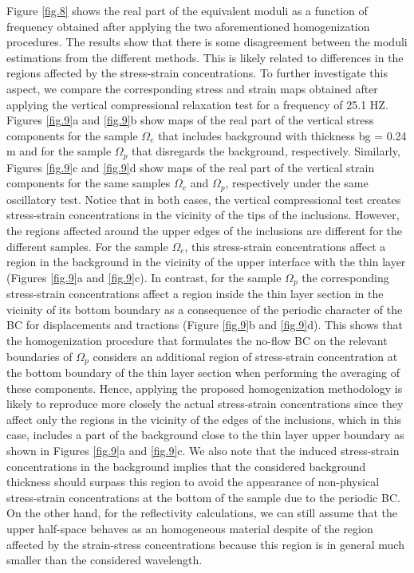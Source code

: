 \documentclass[draft]{agujournal2019}
\begin{document}
Figure \ref{fig.8} shows the real part of the  equivalent moduli as a function of frequency obtained after applying the two aforementioned homogenization procedures.
The results show that there is some disagreement between the moduli estimations from the different methods.
This is likely related to differences in the regions affected by the stress-strain concentrations. To further investigate this aspect, we compare the corresponding stress and strain maps obtained after applying the vertical compressional relaxation test for a frequency of 25.1 HZ. Figures \ref{fig.9}a and \ref{fig.9}b show maps of the real part of the vertical stress components for the sample $\Omega_e$ that includes background with thickness bg = 0.24 m and for the sample $\Omega_p$ that disregards the background, respectively. Similarly, Figures \ref{fig.9}c and \ref{fig.9}d show maps of the real part of the vertical strain components for the same samples  $\Omega_e$ and $\Omega_p$, respectively under the same oscillatory test. Notice that in both cases, the vertical compressional test creates stress-strain concentrations in the vicinity of the tips of the inclusions. However, the regions affected around the upper edges of the inclusions are different for the different samples. For the sample $\Omega_e$, this stress-strain concentrations affect a region in the background in the vicinity of the upper interface with the thin layer (Figures \ref{fig.9}a and \ref{fig.9}c). In contrast, for the sample $\Omega_p$  the corresponding stress-strain concentrations affect a region inside the thin layer section in the vicinity of its bottom boundary as a consequence of the periodic character of the BC for displacements and tractions (Figure \ref{fig.9}b and \ref{fig.9}d). This shows that the homogenization procedure that formulates the no-flow BC on the relevant boundaries of $\Omega_p$ considers an additional region of stress-strain concentration at the bottom boundary of the thin layer section when performing the averaging of these components. Hence, applying the proposed homogenization methodology is likely to reproduce more closely the actual stress-strain concentrations since they affect only the regions in the vicinity of the edges of the inclusions, which in this case, includes a part of the background close to the thin layer upper boundary as shown in Figures \ref{fig.9}a and \ref{fig.9}c.  We also note that the induced stress-strain concentrations in the background implies that the considered background thickness should surpass this region to avoid the appearance of non-physical stress-strain concentrations at the bottom of the sample due to the periodic BC. On the other hand, for the reflectivity calculations, we can still assume that the upper half-space behaves as an homogeneous material despite of the region affected by the strain-stress concentrations because this region is in general much smaller than the considered wavelength.
\end{document}
